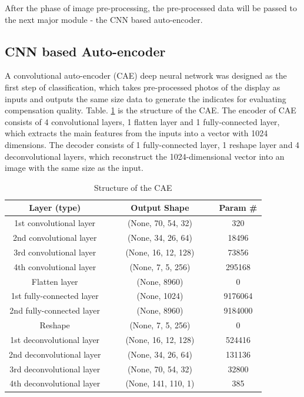 \documentclass[runningheads]{llncs}
\begin{document}
After the phase of image pre-processing, the pre-processed data will be passed to the next major module - the CNN based auto-encoder.
\subsection{CNN based Auto-encoder}
A convolutional auto-encoder (CAE) deep neural network was designed as the first step of classification, which takes pre-processed photos of the display as inputs and outputs the same size data to generate the indicates for evaluating compensation quality. Table. \ref{tab:cae} is the structure of the CAE. The encoder of CAE consists of 4 convolutional layers, 1 flatten layer and 1 fully-connected layer, which extracts the main features from the inputs into a vector with 1024 dimensions.  The decoder consists of 1 fully-connected layer, 1 reshape layer and 4 deconvolutional layers, which reconstruct the 1024-dimensional vector into an image with the same size as the input.
\begin{table}
    \centering
    \caption{Structure of the CAE}
    \label{tab:cae}
    \begin{tabular}{ccccc}
        \toprule
        Layer (type) & $\quad$ &  Output Shape & $\quad$ &  Param \#\\
        \midrule
        1st convolutional layer & \ & (None, 70, 54, 32) & \ &  320 \\
        2nd convolutional layer & \ &  (None, 34, 26, 64) & \ &  18496 \\
        3rd convolutional layer & \ &  (None, 16, 12, 128) & \ &  73856 \\
        4th convolutional layer & \ &  (None, 7, 5, 256)  & \ &  295168 \\
        Flatten layer & \ &  (None, 8960) & \ &  0 \\
        1st fully-connected layer & \ &  (None, 1024) & \ &  9176064 \\
        2nd fully-connected layer & \ &  (None, 8960) & \ & 9184000 \\
        Reshape & \  &  (None, 7, 5, 256) & \ &  0 \\
        1st deconvolutional layer & \  & (None, 16, 12, 128) & \ &  524416\\
        2nd deconvolutional layer & \ &  (None, 34, 26, 64) & \ &  131136  \\
        3rd deconvolutional layer & \ &  (None, 70, 54, 32) & \  &  32800 \\
        4th deconvolutional layer & \ &  (None, 141, 110, 1) & \ &  385 \\
        \bottomrule
    \end{tabular}
\end{table}
\end{document}
